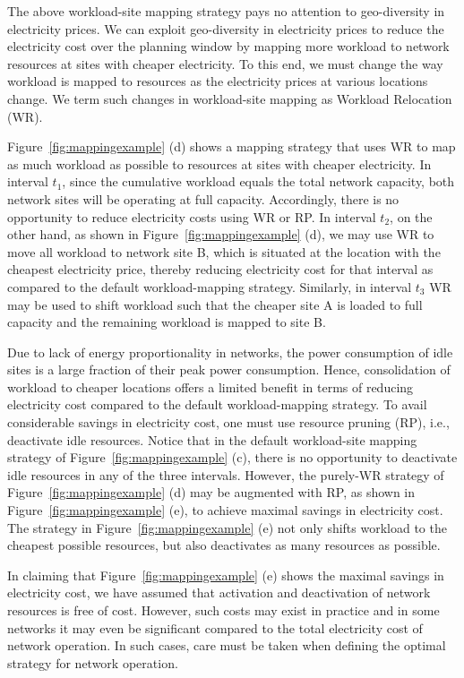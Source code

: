 The above workload-site mapping strategy pays no attention to geo-diversity in electricity prices. We can exploit geo-diversity in electricity prices to reduce the electricity cost over the planning window by mapping more workload to network resources at sites with cheaper electricity. To this end, we must change the way workload is mapped to resources as the electricity prices at various locations change. We term such changes in workload-site mapping as Workload Relocation (WR). 

Figure~\ref{fig:mappingexample} (d) shows a mapping strategy that uses WR to map as much workload as possible to resources at sites with cheaper electricity. In interval $t_1$, since the cumulative workload equals the total network capacity, both network sites will be operating at full capacity. Accordingly, there is no opportunity to reduce electricity costs using WR or RP. In interval $t_2$, on the other hand, as shown in Figure~\ref{fig:mappingexample} (d), we may use WR to move all workload to network site B, which is situated at the location with the cheapest electricity price, thereby reducing electricity cost for that interval as compared to the default workload-mapping strategy. Similarly, in interval $t_3$ WR may be used to shift workload such that the cheaper site A is loaded to full capacity and the remaining workload is mapped to site B. 

Due to lack of energy proportionality in networks, the power consumption of idle sites is a large fraction of their peak power consumption. Hence, consolidation of workload to cheaper locations offers a limited benefit in terms of reducing electricity cost compared to the default workload-mapping strategy. To avail considerable savings in electricity cost, one must use resource pruning (RP), i.e., deactivate idle resources. Notice that in the default workload-site mapping strategy of Figure~\ref{fig:mappingexample} (c), there is no opportunity to deactivate idle resources in any of the three intervals. However, the purely-WR strategy of Figure~\ref{fig:mappingexample} (d) may be augmented with RP, as shown in Figure~\ref{fig:mappingexample} (e), to achieve maximal savings in electricity cost. The strategy in Figure~\ref{fig:mappingexample} (e) not only shifts workload to the cheapest possible resources, but also deactivates as many resources as possible. 

In claiming that Figure~\ref{fig:mappingexample} (e) shows the maximal savings in electricity cost, we have assumed that activation and deactivation of network resources is free of cost. However, such costs may exist in practice and in some networks it may even be significant compared to the total electricity cost of network operation. In such cases, care must be taken when defining the optimal strategy for network operation. %

